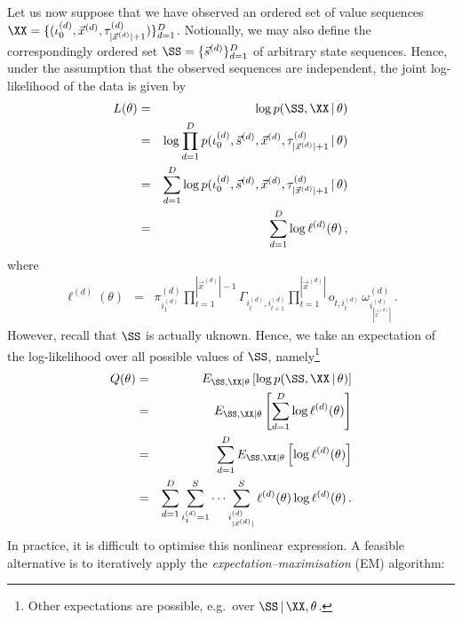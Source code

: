 \documentclass[a4paper]{article}
\begin{document}
Let us now suppose that we have observed an ordered set of value sequences
$\XX=\{(\iota_0^{(d)},\vec{x}^{(d)},\tau_{|\vec{x}^{(d)}|+1}^{(d)})\}_{d=1}^{D}$.
Notionally, we may also define the correspondingly ordered set $\SS=\{\vec{s}^{(d)}\}_{d=1}^D$
of arbitrary state sequences.
Hence, under the assumption that the observed sequences are independent, the joint log-likelihood of the data is given by
\begin{eqnarray}
  L(\theta) & = & \log p(\SS,\XX\,|\,\theta) 
\nonumber\\& = & 
\log\prod_{d=1}^D 
p(\iota_0^{(d)},\vec{s}^{(d)},\vec{x}^{(d)},\tau_{|\vec{x}^{(d)}|+1}^{(d)}\,|\,\theta) 
\nonumber\\& = & 
\sum_{d=1}^D\log 
p(\iota_0^{(d)},\vec{s}^{(d)},\vec{x}^{(d)},\tau_{|\vec{x}^{(d)}|+1}^{(d)}\,|\,\theta) 
\nonumber\\& = & 
\sum_{d=1}^D\log\ell^{(d)}(\theta)
\,,
\end{eqnarray}
where
\begin{eqnarray}
  \ell^{(d)}(\theta) & = &
  \pi_{i_1^{(d)}}^{(d)}\prod_{t=1}^{|\vec{x}^{(d)}|-1}
\Gamma_{i_t^{(d)},i_{t+1}^{(d)}}\prod_{t=1}^{|\vec{x}^{(d)}|}o_{t,i_t^{(d)}}\,\omega_{i_{|\vec{x}^{(d)}|}^{(d)}}^{(d)}
\,.
\end{eqnarray}
However, recall that $\SS$ is actually uknown. Hence, we take an expectation of the log-likelihood over all possible values of
$\SS$, namely\footnote{Other expectations are possible, e.g.\ over $\SS\,|\,\XX,\theta$.}
\begin{eqnarray}
  Q(\theta) & = & E_{\SS,\XX|\theta}\left[\log p(\SS,\XX\,|\,\theta)\right]
\nonumber\\& = & 
E_{\SS,\XX|\theta}\left[
\sum_{d=1}^D\log\ell^{(d)}(\theta)
\right]
\nonumber\\& = & 
\sum_{d=1}^D E_{\SS,\XX|\theta}\left[
\log\ell^{(d)}(\theta)
\right]
\nonumber\\& = & 
\sum_{d=1}^D \sum_{i_1^{(d)}=1}^{S}\cdots\sum_{i^{(d)}_{|\vec{x}^{(d)}|}}^{S}
\ell^{(d)}(\theta)\log\ell^{(d)}(\theta)
\,.
\end{eqnarray}
In practice, it is difficult to optimise this nonlinear expression. A feasible alternative is to iteratively apply the {\em expectation--maximisation}
(EM) algorithm:
\end{document}
